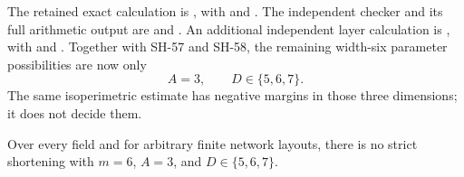 The retained exact calculation is
, with
 and
.
The independent checker and its full arithmetic output
are  and
.
An additional independent layer calculation is
, with
 and
.
Together with SH-57 and SH-58, the remaining
width-six parameter possibilities are now only
\[
                         A=3,\qquad D\in\{5,6,7\}.
\]
The same isoperimetric estimate has negative margins
in those three dimensions; it does not decide them.

\begin{theorem}
\label{thm:width-six-three-term-tail-counts}
Over every field and for arbitrary finite network layouts,
there is no strict shortening with $m=6$, $A=3$, and
$D\in\{5,6,7\}$.
\end{theorem}
